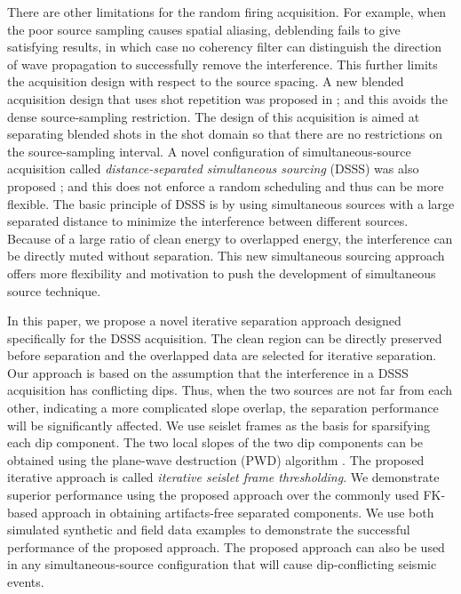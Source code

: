 There are other limitations for the random firing acquisition. For example, when the poor source sampling causes spatial aliasing, deblending fails to give satisfying results, in which case no coherency filter can distinguish the direction of wave propagation to successfully remove the interference. This further limits the acquisition design with respect to the source spacing. A new blended acquisition design that uses shot repetition was proposed in \cite{sixuethesis}; and this avoids
the dense source-sampling restriction. The design of this acquisition is aimed at separating blended shots in the shot domain so that there are no restrictions on the source-sampling interval. A novel configuration of simultaneous-source acquisition called \emph{distance-separated simultaneous sourcing} (DSSS) was also proposed \cite{bouska2009}; and this does not enforce a random scheduling and thus can be more flexible. The basic principle of DSSS is by using simultaneous sources with a large separated distance to minimize the interference between different sources. Because of a large ratio of clean energy to overlapped energy, the interference can be directly muted without separation. This new simultaneous sourcing approach offers more flexibility and motivation to push the development of simultaneous source technique.

In this paper, we propose a novel iterative separation approach designed specifically for the DSSS acquisition. The clean region can be directly preserved before separation and the overlapped data are selected for iterative separation. Our approach is based on the assumption that the interference in a DSSS acquisition has conflicting dips. Thus, when the two sources are not far from each other, indicating a more complicated slope overlap, the separation performance will be significantly affected. We use seislet frames \cite{seislet,shuwei20153} as the basis for sparsifying each dip component. The two local slopes of the two dip components can be obtained using the plane-wave destruction (PWD) algorithm \cite{fomel2002pwd}. The proposed iterative approach is called \emph{iterative seislet frame thresholding}. We demonstrate superior performance using the proposed approach over the commonly used FK-based approach in obtaining artifacts-free separated components. We use both simulated synthetic and field data examples to demonstrate the successful performance of the proposed approach. The proposed approach can also be used in any simultaneous-source configuration that will cause dip-conflicting seismic events.

